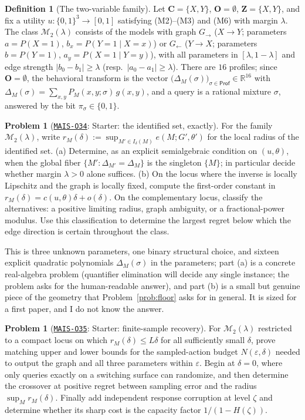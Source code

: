 \documentclass[11pt]{amsart}
\newcommand{\Oid}[1]{\href{https://github.com/lionellevine/MAIS/blob/main/open-problems/MAIS-O#1.md}{\texttt{MAIS-O#1}}}
\theoremstyle{plain}
\theoremstyle{definition}
\newtheorem{definition}[theorem]{Definition}
\newtheorem{problem}[theorem]{Problem}
\newcommand{\bC}{\mathbf{C}}
\newcommand{\bO}{\mathbf{O}}
\newcommand{\bZ}{\mathbf{Z}}
\newcommand{\MM}{\mathcal{M}}
\newcommand{\Prof}{\mathsf{Prof}}
\begin{document}
\begin{definition}[The two-variable family]\label{def:twovar}
Let $\bC=\{X,Y\}$, $\bO=\emptyset$, $\bZ=\{X,Y\}$, and fix a utility $u\colon\{0,1\}^3\to[0,1]$ satisfying (M2)--(M3) and (M6) with margin $\lambda$. The class $\MM_2(\lambda)$ consists of the models with graph $G_\to$ ($X\to Y$; parameters $a=P(X\!=\!1)$, $b_x=P(Y\!=\!1\mid X\!=\!x)$) or $G_\leftarrow$ ($Y\to X$; parameters $b=P(Y\!=\!1)$, $a_y=P(X\!=\!1\mid Y\!=\!y)$), with all parameters in $[\lambda,1-\lambda]$ and edge strength $|b_0-b_1|\ge\lambda$ (resp.\ $|a_0-a_1|\ge\lambda$). There are $16$ profiles; since $\bO=\emptyset$, the behavioral transform is the vector $\bigl(\Delta_M(\sigma)\bigr)_{\sigma\in\Prof}\in\mathbb{R}^{16}$ with $\Delta_M(\sigma)=\sum_{x,y}P_M(x,y;\sigma)\,g(x,y)$, and a query is a rational mixture $\sigma$, answered by the bit $\pi_\sigma\in\{0,1\}$.
\end{definition}

\begin{problem}[\Oid{34}: Starter: the identified set, exactly]\label{prob:starter-set}
For the family $\MM_2(\lambda)$, write $r_M(\delta):=\sup_{M'\in I_\delta(M)}e(M;G',\theta')$ for the local radius of the identified set. (a) Determine, as an explicit semialgebraic condition on $(u,\theta)$, when the global fiber $\{M':\Delta_{M'}=\Delta_M\}$ is the singleton $\{M\}$; in particular decide whether margin $\lambda>0$ alone suffices. (b) On the locus where the inverse is locally Lipschitz and the graph is locally fixed, compute the first-order constant in $r_M(\delta)=c(u,\theta)\delta+o(\delta)$. On the complementary locus, classify the alternatives: a positive limiting radius, graph ambiguity, or a fractional-power modulus. Use this classification to determine the largest regret below which the edge direction is certain throughout the class.
\end{problem}

This is three unknown parameters, one binary structural choice, and sixteen explicit quadratic polynomials $\Delta_M(\sigma)$ in the parameters; part (a) is a concrete real-algebra problem (quantifier elimination will decide any single instance; the problem asks for the human-readable answer), and part (b) is a small but genuine piece of the geometry that Problem~\ref{prob:floor} asks for in general. It is sized for a first paper, and I do not know the answer.

\begin{problem}[\Oid{35}: Starter: finite-sample recovery]\label{prob:starter-sample}
For $\MM_2(\lambda)$ restricted to a compact locus on which $r_M(\delta)\le L\delta$ for all sufficiently small $\delta$, prove matching upper and lower bounds for the sampled-action budget $N(\varepsilon,\delta)$ needed to output the graph and all three parameters within $\varepsilon$. Begin at $\delta=0$, where only queries exactly on a switching surface can randomize, and then determine the crossover at positive regret between sampling error and the radius $\sup_M r_M(\delta)$. Finally add independent response corruption at level $\zeta$ and determine whether its sharp cost is the capacity factor $1/(1-H(\zeta))$.
\end{problem}
\end{document}

